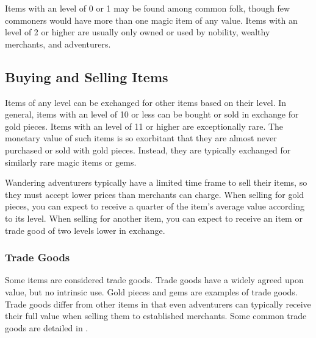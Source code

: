         Items with an level of 0 or 1 may be found among common folk, though few commoners would have more than one magic item of any value.
        Items with an level of 2 or higher are usually only owned or used by nobility, wealthy merchants, and adventurers.

    \subsection{Buying and Selling Items}
        Items of any level can be exchanged for other items based on their level.
        In general, items with an level of 10 or less can be bought or sold in exchange for gold pieces.
        Items with an level of 11 or higher are exceptionally rare.
        The monetary value of such items is so exorbitant that they are almost never purchased or sold with gold pieces.
        Instead, they are typically exchanged for similarly rare magic items or gems.

        Wandering adventurers typically have a limited time frame to sell their items, so they must accept lower prices than merchants can charge.
        When selling for gold pieces, you can expect to receive a quarter of the item's average value according to its level.
        When selling for another item, you can expect to receive an item or trade good of two levels lower in exchange.

        \subsubsection{Trade Goods}
            Some items are considered trade goods.
            Trade goods have a widely agreed upon value, but no intrinsic use.
            Gold pieces and gems are examples of trade goods.
            Trade goods differ from other items in that even adventurers can typically receive their full value when selling them to established merchants.
            Some common trade goods are detailed in .

